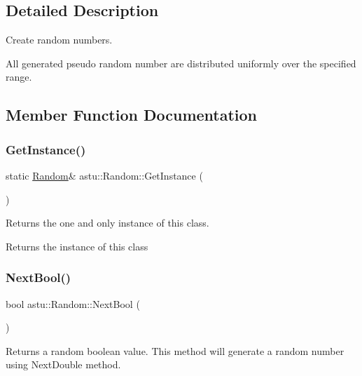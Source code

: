 \subsection{Detailed Description}
Create random numbers.

All generated pseudo random number are distributed uniformly over the specified range. 

\subsection{Member Function Documentation}
\mbox{\label{classastu_1_1Random_ab11313efe9636e69c15df5dd1cf90124}} 
\subsubsection{\texorpdfstring{Get\+Instance()}{GetInstance()}}
{\footnotesize\ttfamily static \hyperlink{classastu_1_1Random}{Random}\& astu\+::\+Random\+::\+Get\+Instance (\begin{DoxyParamCaption}{ }\end{DoxyParamCaption})\hspace{0.3cm}{\ttfamily [static]}}

Returns the one and only instance of this class.

\begin{DoxyReturn}{Returns}
the instance of this class 
\end{DoxyReturn}
\mbox{\label{classastu_1_1Random_a897ae008b0ecaa39ae970f794431b3ac}} 
\subsubsection{\texorpdfstring{Next\+Bool()}{NextBool()}}
{\footnotesize\ttfamily bool astu\+::\+Random\+::\+Next\+Bool (\begin{DoxyParamCaption}{ }\end{DoxyParamCaption})\hspace{0.3cm}{\ttfamily [inline]}}

Returns a random boolean value. This method will generate a random number using Next\+Double method.

